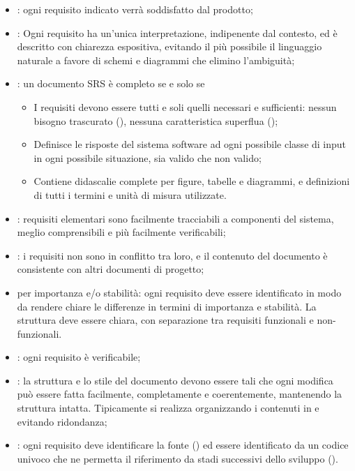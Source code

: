 \begin{itemize}
  \item {}: ogni requisito indicato verrà soddisfatto dal
    prodotto;
  \item {}: Ogni requisito ha un'unica interpretazione,
  indipenente dal contesto, ed è descritto con chiarezza
    espositiva, evitando il più possibile il linguaggio naturale a favore di
    schemi e diagrammi che elimino l'ambiguità;
  \item {}: un documento SRS è completo se e solo se
    \begin{itemize}
      \item I requisiti devono essere tutti e soli quelli necessari e
        sufficienti: nessun bisogno trascurato (), nessuna
        caratteristica superflua ();
      \item Definisce le risposte del sistema software ad ogni possibile classe
        di input in ogni possibile situazione, sia valido che non valido;
      \item Contiene didascalie complete per figure, tabelle e diagrammi, e
        definizioni di tutti i termini e unità di misura utilizzate.
    \end{itemize}
  \item {}: requisiti elementari sono facilmente
    tracciabili a componenti del sistema, meglio comprensibili e più facilmente
    verificabili;
  \item {}: i requisiti non sono in conflitto tra loro, e il
  contenuto del documento è consistente con altri documenti di progetto;
  \item {} per importanza e/o stabilità: ogni requisito deve
    essere identificato in modo da rendere chiare le differenze in termini di
    importanza e stabilità. La struttura deve essere chiara, con separazione
    tra requisiti funzionali e non-funzionali.
  \item {}: ogni requisito è verificabile;
  \item {}: la struttura e lo stile del documento devono
    essere tali che ogni modifica può essere fatta facilmente, completamente e
    coerentemente, mantenendo la struttura intatta. Tipicamente si realizza
    organizzando i contenuti in  e evitando
    ridondanza;
  \item {}: 
    ogni requisito deve identificare la fonte ()
    ed essere identificato da un codice univoco che ne permetta il riferimento
    da stadi successivi dello sviluppo ().
\end{itemize}

